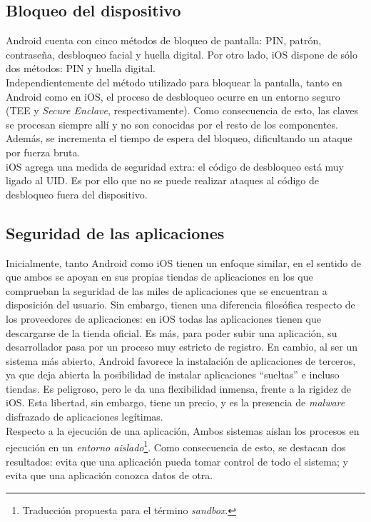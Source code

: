 \subsection{Bloqueo del dispositivo}
Android cuenta con cinco métodos de bloqueo de pantalla: PIN, patrón, contraseña, desbloqueo facial y huella digital. Por otro lado, iOS dispone de sólo dos métodos: PIN y huella digital.\\

Independientemente del método utilizado para bloquear la pantalla, tanto en Android como en iOS, el proceso de desbloqueo ocurre en un entorno seguro (TEE y \emph{Secure Enclave}, respectivamente). Como consecuencia de esto, las claves se procesan siempre allí y no son conocidas por el resto de los componentes. Además, se incrementa el tiempo de espera del bloqueo, dificultando un ataque por fuerza bruta.\\

iOS agrega una medida de seguridad extra: el código de desbloqueo está muy ligado al UID. Es por ello que no se puede realizar ataques al código de desbloqueo fuera del dispositivo.
\subsection{Seguridad de las aplicaciones}
Inicialmente, tanto Android como iOS tienen un enfoque similar, en el sentido de que ambos se apoyan en sus propias tiendas de aplicaciones en los que comprueban la seguridad de las miles de aplicaciones que se encuentran a disposición del usuario. Sin embargo, tienen una diferencia filosófica respecto de los proveedores de aplicaciones: en iOS todas las aplicaciones tienen que descargarse de la tienda oficial. Es más, para poder subir una aplicación, su desarrollador pasa por un proceso muy estricto de registro. En cambio, al ser un sistema más abierto, Android favorece la instalación de aplicaciones de terceros, ya que deja abierta la posibilidad de instalar aplicaciones ``sueltas'' e incluso tiendas. Es peligroso, pero le da una flexibilidad inmensa, frente a la rigidez de iOS. Esta libertad, sin embargo, tiene un precio, y es la presencia de \emph{malware} disfrazado de aplicaciones legítimas.\\

Respecto a la ejecución de una aplicación, Ambos sistemas aislan los procesos en ejecución en un \emph{entorno aislado}\footnote{Traducción propuesta para el término \textit{sandbox}.}. Como consecuencia de esto, se destacan dos resultados: evita que una aplicación pueda tomar control de todo el sistema; y evita que una aplicación conozca datos de otra.\\

